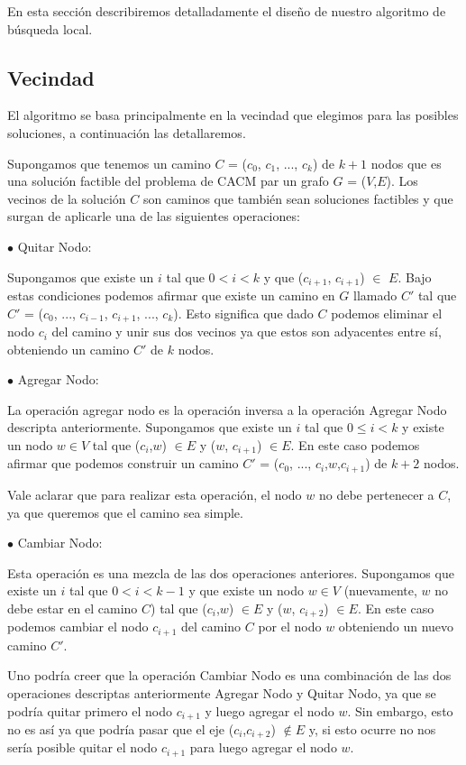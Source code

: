 En esta sección describiremos detalladamente el diseño de nuestro algoritmo de búsqueda local. 

\subsection{Vecindad}

El algoritmo se basa principalmente en la vecindad que elegimos para las posibles soluciones, a continuación las detallaremos.

Supongamos que tenemos un camino $C$ = ($c_0$, $c_1$, ..., $c_k$) de $k+1$ nodos que es una solución factible del problema de CACM par un grafo $G$ = ($V$,$E$). Los vecinos de la solución $C$ son caminos que también sean soluciones factibles y que surgan de aplicarle una de las siguientes operaciones:

$\bullet$ Quitar Nodo:

Supongamos que existe un $i$ tal que $0 < i < k$ y que ($c_{i+1}$, $c_{i+1}$) $\in$ $E$. Bajo estas condiciones podemos afirmar que existe un camino en $G$ llamado $C'$ tal que $C'$ = ($c_0$, ..., $c_{i-1}$, $c_{i+1}$, ..., $c_k$). Esto significa que dado $C$ podemos eliminar el nodo $c_i$ del camino y unir sus dos vecinos ya que estos son adyacentes entre sí, obteniendo un camino $C'$ de $k$ nodos.

$\bullet$ Agregar Nodo:

La operación agregar nodo es la operación inversa a la operación Agregar Nodo descripta anteriormente. Supongamos que existe un $i$ tal que $0 \leq i < k$ y existe un nodo $w \in V$ tal que ($c_i$,$w$) $\in E$ y ($w$, $c_{i+1}$) $\in E$. En este caso podemos afirmar que podemos construir un camino $C'$ = ($c_0$, ..., $c_{i}$,$w$,$c_{i+1}$) de $k+2$ nodos.

Vale aclarar que para realizar esta operación, el nodo $w$ no debe pertenecer a $C$, ya que queremos que el camino sea simple.

$\bullet$ Cambiar Nodo:

Esta operación es una mezcla de las dos operaciones anteriores. Supongamos que existe un $i$ tal que $0 < i < k-1$ y que existe un nodo $w \in V$ (nuevamente, $w$ no debe estar en el camino $C$) tal que ($c_i$,$w$) $\in E$ y ($w$, $c_{i+2}$) $\in E$. En este caso podemos cambiar el nodo $c_{i+1}$ del camino $C$ por el nodo $w$ obteniendo un nuevo camino $C'$.

Uno podría creer que la operación Cambiar Nodo es una combinación de las dos operaciones descriptas anteriormente Agregar Nodo y Quitar Nodo, ya que se podría quitar primero el nodo $c_{i+1}$ y luego agregar el nodo $w$. Sin embargo, esto no es así ya que podría pasar que el eje ($c_i$,$c_{i+2}$) $\notin E$ y, si esto ocurre no nos sería posible quitar el nodo $c_{i+1}$ para luego agregar el nodo $w$.


